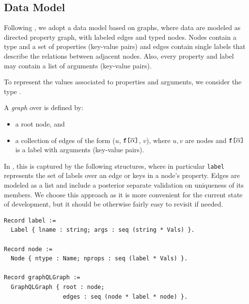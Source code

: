 \subsection{Data Model}\label{subsec:graph}
Following \HP, we adopt a data model based on graphs, where data are
modeled as directed property graph, with labeled edges and typed
nodes. Nodes contain a type and a set of properties (key-value pairs)
and  edges contain single labels that describe the relations between
adjacent nodes. Also, every property and label may contain a list of
arguments (key-value pairs). %

To represent the values associated to properties and arguments, we consider the type \Vals. 

\begin{definition}
A \emph{\gql graph} over \Vals{} is defined by:
\begin{itemize}
    \item a root node, and
    \item a collection of edges of the form ($u$, $\texttt{f[}\overline{\alpha}\texttt{]}$, $v$), where $u, v$ are nodes and
      $\texttt{f[}\overline{\alpha}\texttt{]}$ is a label with arguments
      (key-value pairs).
\end{itemize}
\end{definition}

In \gcoql, this is captured by the following structures, where in
particular \texttt{label} represents the set of labels over an edge or keys in a node's property.
Edges are modeled as a list and include a posterior separate validation on uniqueness of its members.
We choose this approach as it is more convenient for the current state of development, but it should be otherwise fairly easy to revisit if needed.
%
\begin{verbatim}
Record label := 
  Label { lname : string; args : seq (string * Vals) }.

Record node := 
  Node { ntype : Name; nprops : seq (label * Vals) }.

Record graphQLGraph := 
  GraphQLGraph { root : node; 
                 edges : seq (node * label * node) }.
\end{verbatim}



